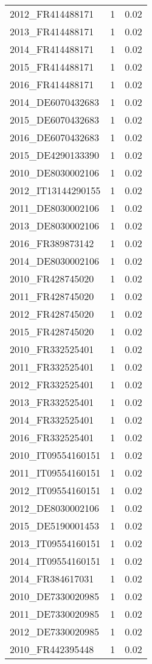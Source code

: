 \begin{table*}[htbp]
\begin{tabular}{lrr}
2012_FR414488171 & 1 & 0.02 \\
2013_FR414488171 & 1 & 0.02 \\
2014_FR414488171 & 1 & 0.02 \\
2015_FR414488171 & 1 & 0.02 \\
2016_FR414488171 & 1 & 0.02 \\
2014_DE6070432683 & 1 & 0.02 \\
2015_DE6070432683 & 1 & 0.02 \\
2016_DE6070432683 & 1 & 0.02 \\
2015_DE4290133390 & 1 & 0.02 \\
2010_DE8030002106 & 1 & 0.02 \\
2012_IT13144290155 & 1 & 0.02 \\
2011_DE8030002106 & 1 & 0.02 \\
2013_DE8030002106 & 1 & 0.02 \\
2016_FR389873142 & 1 & 0.02 \\
2014_DE8030002106 & 1 & 0.02 \\
2010_FR428745020 & 1 & 0.02 \\
2011_FR428745020 & 1 & 0.02 \\
2012_FR428745020 & 1 & 0.02 \\
2015_FR428745020 & 1 & 0.02 \\
2010_FR332525401 & 1 & 0.02 \\
2011_FR332525401 & 1 & 0.02 \\
2012_FR332525401 & 1 & 0.02 \\
2013_FR332525401 & 1 & 0.02 \\
2014_FR332525401 & 1 & 0.02 \\
2016_FR332525401 & 1 & 0.02 \\
2010_IT09554160151 & 1 & 0.02 \\
2011_IT09554160151 & 1 & 0.02 \\
2012_IT09554160151 & 1 & 0.02 \\
2012_DE8030002106 & 1 & 0.02 \\
2015_DE5190001453 & 1 & 0.02 \\
2013_IT09554160151 & 1 & 0.02 \\
2014_IT09554160151 & 1 & 0.02 \\
2014_FR384617031 & 1 & 0.02 \\
2010_DE7330020985 & 1 & 0.02 \\
2011_DE7330020985 & 1 & 0.02 \\
2012_DE7330020985 & 1 & 0.02 \\
2010_FR442395448 & 1 & 0.02 \\

\end{tabular}
\end{table*}
